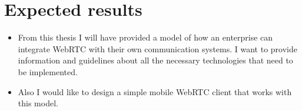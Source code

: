 

\section{Expected results}

\begin{itemize}
    \item From this thesis I will have provided a model of how an enterprise can integrate WebRTC with their own communication systems. I want to provide information and guidelines about all the necessary technologies that need to be implemented.
    \item Also I would like to design a simple mobile WebRTC client that works with this model.
\end{itemize}
